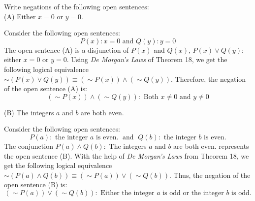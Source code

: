 \documentclass[12pt]{article}
\newenvironment{problem}[2][Problem]{\begin{trivlist}
		\item[\hskip \labelsep {\bfseries #1}\hskip \labelsep {\bfseries #2.}]}{\end{trivlist}}
\newenvironment{solution}[2][Solution]{\begin{trivlist}
		\item[\hskip \labelsep {\bfseries #1}\hskip \labelsep {\bfseries #2.}]}{\end{trivlist}}
\begin{document}
\begin{problem}{59}
	Write negations of the following open sentences:\\
	
	(A) Either $x = 0$ or $y = 0$.
	\begin{solution}{a}
		Consider the following open sentences: 
		\begin{equation*}
			P(x) : x = 0 \text{ and } Q(y) : y = 0
		\end{equation*}
		The open sentence (A) is a disjunction of $P(x)$ and $Q(x)$, $P(x)\vee Q(y):$ either $x = 0$ or $y = 0$. Using \textit{De Morgan's Laws} of Theorem 18, we get the following logical equivalence $\sim (P(x)\vee Q(y)) \equiv (\sim P(x))\wedge (\sim Q(y))$.
		Therefore, the negation of the open sentence (A) is:
		\begin{equation*}
			(\sim P(x))\wedge (\sim Q(y)) : \text{ Both } x\neq 0 \text{ and } y\neq 0
		\end{equation*}
	\end{solution} 
	
	(B) The integers $a$ and $b$ are both even.
	\begin{solution}{b}
		Consider the following open sentences:
		\begin{equation*}
			P(a) : \text{ the integer } a \text{ is even.} \; \text{ and } \; Q(b) : \text{ the integer } b \text{ is even.}
		\end{equation*}
	The conjunction $P(a) \wedge Q(b) : $ The integers $a$ and $b$ are both even. represents the open sentence (B). With the help of \textit{De Morgan's Laws} from Theorem 18, we get the following logical equivalence $\sim (P(a) \wedge Q(b)) \equiv (\sim P(a))\vee (\sim Q(b))$. Thus, the negation of the open sentence (B) is:
	\begin{equation*}
		(\sim P(a))\vee(\sim Q(b)) : \text{ Either the integer } a \text{ is odd or the integer } b \text{ is odd.}
	\end{equation*}
	\end{solution}
\end{problem}
\end{document}

